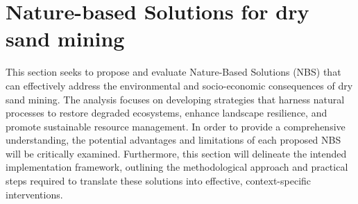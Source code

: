 \section{Nature-based Solutions for dry sand mining}




This section seeks to propose and evaluate Nature-Based Solutions (NBS) that can effectively address the environmental and socio-economic consequences of dry sand mining. The analysis focuses on developing strategies that harness natural processes to restore degraded ecosystems, enhance landscape resilience, and promote sustainable resource management. In order to provide a comprehensive understanding, the potential advantages and limitations of each proposed NBS will be critically examined. Furthermore, this section will delineate the intended implementation framework, outlining the methodological approach and practical steps required to translate these solutions into effective, context-specific interventions.

